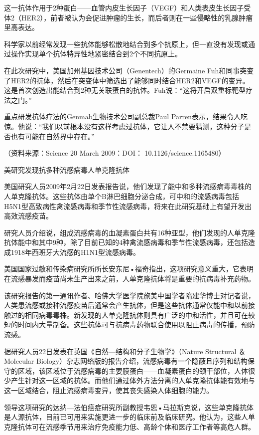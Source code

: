 这一抗体作用于2种蛋白------血管内皮生长因子（VEGF）和人类表皮生长因子受体2（HER2），前者被认为会促进肿瘤的生长，而后者则在一些侵略性的乳腺肿瘤里高表达。

科学家以前经常发现一些抗体能够松散地结合到多个抗原上，但一直没有发现或通过操作实现单个抗体特异性地紧密结合到2个不同抗原上。

在此次研究中，美国加州基因技术公司（Genentech）的Germaine
Fuh和同事突变了HER2的抗体，然后在突变体中筛选出了能够同时结合HER2和VEGF的变异。这是首次创造出能结合到2种无关联蛋白的抗体。Fuh说：“这将开启双重标靶型疗法之门。”

重点研发抗体疗法的Genmab生物技术公司副总裁Paul
Parren表示，结果令人吃惊。他说：“我们以前根本没有这样考虑过抗体，它让人不禁要猜测，这种分子是否也有可能在自然界中存在。”

（资料来源：Science 20 March 2009：DOI： 10.1126/science.1165480）

\begin{center}
{\Large 美研究发现抗多种流感病毒人单克隆抗体}
\end{center}
美国研究人员2009年2月22日发表报告说，他们发现了能中和多种流感病毒毒株的人单克隆抗体。这些抗体由单个B淋巴细胞分泌合成，可中和的流感病毒包括H5N1型高致病性禽流感病毒和季节性流感病毒，将来在此研究基础上有望开发出高效流感疫苗。

研究人员介绍说，组成流感病毒的血凝素蛋白共有16种亚型，他们发现的人单克隆抗体能中和其中9种，除了目前已知的4种禽流感病毒和季节性流感病毒，还包括造成1918年西班牙大流感的H1N1型流感病毒。

美国国家过敏和传染病研究所所长安东尼•福奇指出，这项研究意义重大，它表明在流感暴发而疫苗尚未生产出来之前，人单克隆抗体将是重要的抗病毒补充药物。

该研究报告的第一通讯作者、哈佛大学医学院旅美中国学者隋建华博士对记者说，人类患流感或接种流感疫苗后通常会产生抗体，但是这些抗体通常仅能中和以前接触过的相同病毒毒株。新发现的人单克隆抗体则具有广泛的中和活性，并且可在较短的时间内大量制备。这些抗体可与抗病毒药物联合使用以阻止病毒的传播，预防流感。

据研究人员22日发表在英国《自然---结构和分子生物学》（Nature Structural
＆ Molecular
Biology）杂志网络版的报告介绍，流感病毒有一个隐蔽且序列和结构保守的区域，该区域位于流感病毒的主要膜蛋白------血凝素蛋白的颈干部位，人体很少产生针对这一区域的抗体。而他们通过体外方法分离的人单克隆抗体能有效地与这一区域结合，阻止流感病毒变异，使其丧失感染人体细胞的能力。

领导这项研究的达纳---法伯癌症研究所副教授韦恩•马拉斯克说，这些单克隆抗体是人源抗体，目前已可用来实施更进一步的临床前及临床研究。他认为，这些人单克隆抗体可在流感季节用来治疗免疫能力低、高龄个体和医疗工作者等高危人群。


